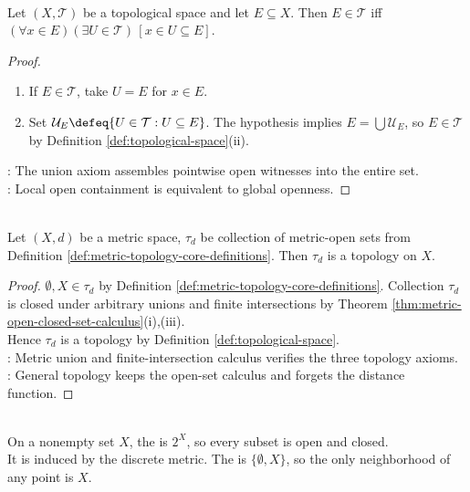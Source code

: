 \begin{proposition} \label{prop:open-neighborhood-test-topological} \\
Let $(X,\mathcal{T})$ be a topological space and let $E\subseteq X$. Then $E\in\mathcal{T}$ iff $(\forall x\in E)(\exists U\in\mathcal{T})\,[x\in U\subseteq E]$.
\begin{proof}
\begin{enumerate}[label=\roman*.]
\setlength{\itemsep}{0pt}
\item[$(\Rightarrow)$] If $E\in\mathcal{T}$, take $U=E$ for $x\in E$.
\item[$(\Leftarrow)$] Set $\mathcal{U}_E\defeq\{U\in\mathcal{T}:U\subseteq E\}$. The hypothesis implies $E=\bigcup\mathcal{U}_E$, so $E\in\mathcal{T}$ by Definition \ref{def:topological-space}(ii).
\end{enumerate}
: The union axiom assembles pointwise open witnesses into the entire set.\\
: Local open containment is equivalent to global openness.
\end{proof}
\end{proposition}

\begin{proposition} \label{prop:metric-open-sets-form-topology} \\
Let $(X,d)$ be a metric space, $\tau_d$ be collection of metric-open sets from Definition \ref{def:metric-topology-core-definitions}. Then $\tau_d$ is a topology on $X$.
\begin{proof}
$\emptyset,X\in\tau_d$ by Definition \ref{def:metric-topology-core-definitions}. Collection $\tau_d$ is closed under arbitrary unions and finite intersections by Theorem \ref{thm:metric-open-closed-set-calculus}(i),(iii).\\
Hence $\tau_d$ is a topology by Definition \ref{def:topological-space}.\\
: Metric union and finite-intersection calculus verifies the three topology axioms.\\
: General topology keeps the open-set calculus and forgets the distance function.
\end{proof}
\end{proposition}

\begin{example} \label{ex:discrete-and-trivial-topologies} \\
On a nonempty set $X$, the  is $2^X$, so every subset is open and closed.\\
It is induced by the discrete metric. The  is $\{\emptyset,X\}$, so the only neighborhood of any point is $X$.
\end{example}

